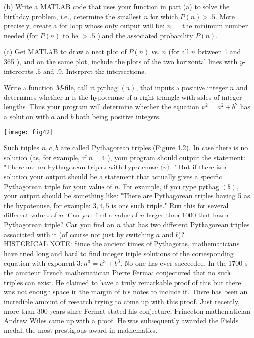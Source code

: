 \documentclass[../main.tex]{subfiles}
\begin{document}
\begin{enumerate}
(b) Write a MATLAB code that uses your function in part (a) to solve the birthday problem, i.e., determine the smallest $n$ for which $P(n)>.5$. More precisely, create a for loop whose only output will be: $n=$ the minimum number needed (for $P(n)$ to be $>.5$ ) and the associated probability $P(n)$.

(c) Get MATLAB to draw a neat plot of $P(n)$ vs. $n$ (for all $n$ between 1 and 365 ), and on the same plot, include the plots of the two horizontal lines with $y$-intercepts $.5$ and .9. Interpret the intersections.



\begin{minipage}[t]{.6\linewidth}
\item Write a function $M$-file, call it pythag $(n)$, that inputs a positive integer $n$ and determines whether $\boldsymbol{n}$ is the hypotenuse of a right triangle with sides of integer lengths. Thus your program will determine whether the equation $n^{2}=a^{2}+b^{2}$ has a solution with $a$ and $b$ both being positive integers.

\end{minipage}
\hspace{0.02\linewidth}
\begin{minipage}[t]{.5\linewidth}
  \strut\vspace*{-\baselineskip}\newline\texttt{[image: fig42]}
\label{fig:fig_4_2}
\end{minipage}

Such triples $n, a, b$ are called Pythagorean triples (Figure 4.2). In case there is no solution (as, for example, if $n=4$ ), your program should output the statement: "There are no Pythagorean triples with hypotenuse $\langle n\rangle$. " But if there is a solution your output should be a statement that actually gives a specific Pythagorean triple for your value of $n$. For example, if you type pythag $(5)$, your output should be something like: "There are Pythagorean triples having 5 as the hypotenuse, for example: $3,4,5$ is one such triple." Run this for several different values of $n$. Can you find a value of $n$ larger than 1000 that has a Pythagorean triple? Can you find an $n$ that has two different Pythagorean triples associated with it (of course not just by switching $a$ and $b$)?\\

HISTORICAL NOTE: Since the ancient times of Pythagoras, mathematicians have tried long and hard to find integer triple solutions of the corresponding equation with exponent $3: n^{3}=a^{3}+b^{3}$. No one has ever succeeded. In the 1700 s the amateur French mathematician Pierre Fermat conjectured that no such triples can exist. He claimed to have a truly remarkable proof of this but there was not enough space in the margin of his notes to include it. There has been an incredible amount of research trying to come up with this proof. Just recently, more than 300 years since Fermat stated his conjecture, Princeton mathematician Andrew Wiles came up with a proof. He was subsequently awarded the Fields medal, the most prestigious award in mathematics.


\end{enumerate}
\end{document}
